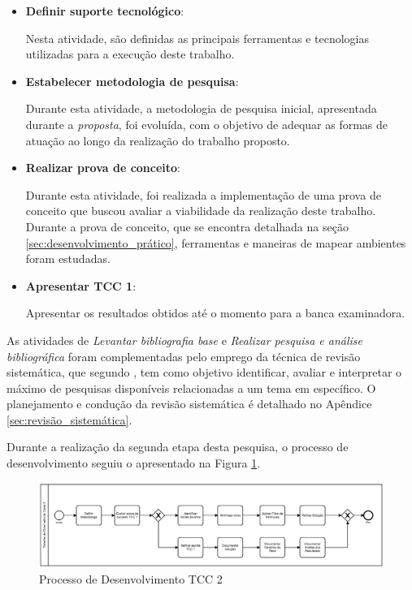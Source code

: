 \begin{itemize}
	\item \textbf{Definir suporte tecnológico}:

		Nesta atividade, são definidas as principais ferramentas e tecnologias utilizadas para a execução deste trabalho.

	\item \textbf{Estabelecer metodologia de pesquisa}:

		Durante esta atividade, a metodologia de pesquisa inicial, apresentada durante a \textit{proposta}, foi evoluída, com o objetivo de adequar as formas de atuação ao longo da realização do trabalho proposto.

	\item \textbf{Realizar prova de conceito}:

		Durante esta atividade, foi realizada a implementação de uma prova de conceito que buscou avaliar a viabilidade da realização deste trabalho. Durante a prova de conceito, que se encontra detalhada na seção \ref{sec:desenvolvimento_prático}, ferramentas e maneiras de mapear ambientes foram estudadas.

	\item \textbf{Apresentar TCC 1}:

		Apresentar os resultados obtidos até o momento para a banca examinadora.
\end{itemize}

As atividades de \textit{Levantar bibliografia base} e \textit{Realizar pesquisa e análise bibliográfica} foram complementadas pelo emprego da técnica de revisão sistemática, que segundo \cite{Kitchenham}, tem como objetivo identificar, avaliar e interpretar o máximo de pesquisas disponíveis relacionadas a um tema em específico. O planejamento e condução da revisão sistemática é detalhado no Apêndice \ref{sec:revisão_sistemática}.

Durante a realização da segunda etapa desta pesquisa, o processo de desenvolvimento seguiu o apresentado na Figura \ref{img:processo_tcc2}.

\begin{figure}[H]
	\centering
	\includegraphics[scale=0.35]{figuras/processo_tcc2.eps}
	\caption[Processo de Desenvolvimento TCC 2]{Processo de Desenvolvimento TCC 2}
	\label{img:processo_tcc2}
\end{figure}

